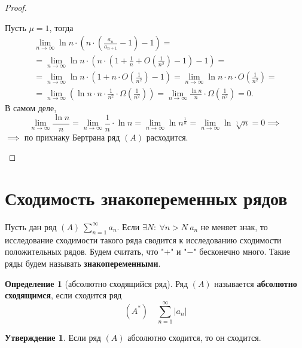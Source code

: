 \documentclass{report}
\theoremstyle{definition}
\newtheorem{definition}{Определение}[section]
\newtheorem{statement}{Утверждение}[section]
\begin{document}
\begin{proof}
\begin{enumerate}
          Пусть $\mu = 1$, тогда
          \begin{multline*}
            \underset{n\rightarrow\infty}{\lim}\ln n \cdot (n \cdot (\frac{a_n}{a_{n+1}} - 1) - 1) = \\
            = \underset{n\rightarrow\infty}{\lim}\ln n \cdot (n \cdot (1 + \frac{1}{n} + O(\frac{1}{n^2}) - 1) - 1) = \\
            = \underset{n\rightarrow\infty}{\lim}\ln n \cdot (1 + n \cdot O(\frac{1}{n^2}) - 1) = \underset{n\rightarrow\infty}{\lim}\ln n \cdot n \cdot O(\frac{1}{n^2}) = \\
            = \underset{n\rightarrow\infty}{\lim}(\ln n \cdot n \cdot \frac{1}{n^2} \cdot \Omega(\frac{1}{n^2})) = \underset{n\rightarrow\infty}{\lim}\frac{\ln n}{n} \cdot \Omega(\frac{1}{n^2}) = 0.
          \end{multline*}
          В самом деле,
          \begin{equation*}
            \underset{n\rightarrow\infty}{\lim}\frac{\ln n}{n} = \underset{n\rightarrow\infty}{\lim} \frac{1}{n} \cdot \ln n = \underset{n\rightarrow\infty}{\lim}\ln n^{\frac{1}{n}} = \underset{n\rightarrow\infty}{\lim} \ln \sqrt[1]{n} = 0 \implies
          \end{equation*}
          $\implies$ по прихнаку Бертрана ряд $(A)$ расходится.
  \end{enumerate}
\end{proof}

\section{Сходимость знакопеременных рядов}

Пусть дан ряд $(A) \ \sum_{n=1}^{\infty} a_n$. Если $\exists N: \ \forall n > N \ a_n$ не меняет знак, то исследование сходимости такого ряда сводится к исследованию сходимости положительных рядов. Будем считать, что "$+$" и "$-$" бесконечно много. Такие ряды будем называть \textbf{знакопеременными}.

\begin{definition}[абсолютно сходящийся ряд]
  Ряд $(A)$ называется \textbf{абсолютно сходящимся}, если сходится ряд
  \begin{equation*}
    (A^*) \quad \sum_{n=1}^{\infty}|a_n|
  \end{equation*}
\end{definition}

\begin{statement}
  Если ряд $(A)$ абсолютно сходится, то он сходится.
\end{statement}
\end{document}
